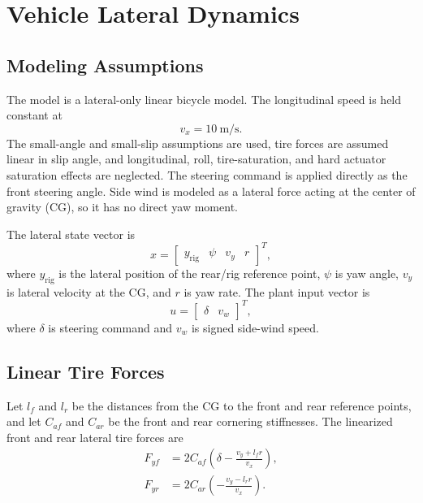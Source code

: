\documentclass[10pt,twocolumn]{article}
\begin{document}
\section{Vehicle Lateral Dynamics}

\subsection{Modeling Assumptions}

The model is a lateral-only linear bicycle model. The longitudinal speed is
held constant at
\begin{equation}
    v_x = 10~\mathrm{m/s}.
\end{equation}
The small-angle and small-slip assumptions are used, tire forces are assumed
linear in slip angle, and longitudinal, roll, tire-saturation, and hard actuator
saturation effects are neglected. The steering command is applied directly as
the front steering angle. Side wind is modeled as a lateral force acting at the
center of gravity (CG), so it has no direct yaw moment.

The lateral state vector is
\begin{equation}
    x =
    \begin{bmatrix}
        y_{\mathrm{rig}} & \psi & v_y & r
    \end{bmatrix}^{T},
\end{equation}
where $y_{\mathrm{rig}}$ is the lateral position of the rear/rig reference
point, $\psi$ is yaw angle, $v_y$ is lateral velocity at the CG, and $r$ is yaw
rate. The plant input vector is
\begin{equation}
    u =
    \begin{bmatrix}
        \delta & v_w
    \end{bmatrix}^{T},
\end{equation}
where $\delta$ is steering command and $v_w$ is signed side-wind speed.

\subsection{Linear Tire Forces}

Let $l_f$ and $l_r$ be the distances from the CG to the front and rear
reference points, and let $C_{af}$ and $C_{ar}$ be the front and rear cornering
stiffnesses. The linearized front and rear lateral tire forces are
\begin{align}
    F_{yf} &=
    2 C_{af}
    \left(
        \delta - \frac{v_y + l_f r}{v_x}
    \right), \label{eq:front_force}\\
    F_{yr} &=
    2 C_{ar}
    \left(
        -\frac{v_y - l_r r}{v_x}
    \right). \label{eq:rear_force}
\end{align}
\end{document}
